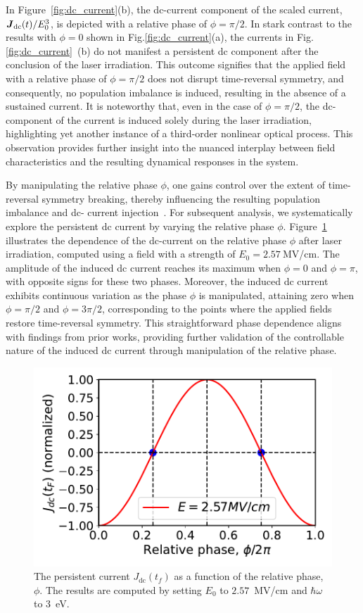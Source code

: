 In Figure~\ref{fig:dc_current}(b), the dc-current component of the scaled current, $\boldsymbol{J}_{\text{dc}}(t)/E_0^3$, is depicted with a relative phase of $\phi=\pi/2$. In stark contrast to the results with $\phi=0$ shown in Fig.\ref{fig:dc_current}(a), the currents in Fig.\ref{fig:dc_current}~(b) do not manifest a persistent dc component after the conclusion of the laser irradiation. This outcome signifies that the applied field with a relative phase of $\phi=\pi/2$ does not disrupt time-reversal symmetry, and consequently, no population imbalance is induced, resulting in the absence of a sustained current. It is noteworthy that, even in the case of $\phi=\pi/2$, the dc-component of the current is induced solely during the laser irradiation, highlighting yet another instance of a third-order nonlinear optical process. This observation provides further insight into the nuanced interplay between field characteristics and the resulting dynamical responses in the system.


By manipulating the relative phase $\phi$, one gains control over the extent of time-reversal symmetry breaking, thereby influencing the resulting population imbalance and dc- current injection~\cite{PhysRevLett.74.3596}. For subsequent analysis, we systematically explore the persistent dc current by varying the relative phase $\phi$. Figure~\ref{fig: imbalance} illustrates the dependence of the dc-current on the relative phase $\phi$ after laser irradiation, computed using a field with a strength of $E_0=2.57~$MV/cm. The amplitude of the induced dc current reaches its maximum when $\phi=0$ and $\phi=\pi$, with opposite signs for these two phases. Moreover, the induced dc current exhibits continuous variation as the phase $\phi$ is manipulated, attaining zero when $\phi=\pi/2$ and $\phi=3\pi/2$, corresponding to the points where the applied fields restore time-reversal symmetry. This straightforward phase dependence aligns with findings from prior works\cite{PhysRevLett.74.3596,PhysRevLett.78.306}, providing further validation of the controllable nature of the induced dc current through manipulation of the relative phase.

\begin{figure}[htbp]
\centering
\includegraphics[width=0.8\linewidth]{pic/relativephase.pdf}
\caption{\label{fig: imbalance} 
The persistent current $J_{\text{dc}}(t_f)$ as a function of the relative phase, $\phi$. The results are computed by setting $E_0$ to $2.57$~MV/cm and $\hbar \omega$ to 3~eV.}
\end{figure}


